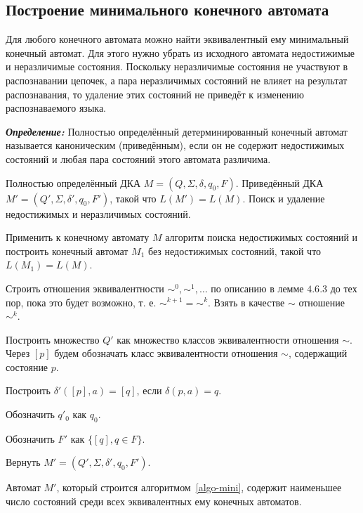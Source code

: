 \subsection*{Построение минимального конечного автомата}
Для любого конечного автомата можно найти эквивалентный ему минимальный конечный автомат. Для этого нужно убрать из исходного автомата недостижимые и неразличимые состояния. Поскольку неразличимые состояния не участвуют в распознавании цепочек, а пара неразличимых состояний не влияет на результат распознавания, то удаление этих состояний не приведёт к изменению распознаваемого языка.

\textbf{\textit{Определение:}} Полностью определённый детерминированный конечный автомат называется каноническим (приведённым), если он не содержит недостижимых состояний и любая пара состояний этого автомата различима.

{
	Полностью определённый ДКА $M = (Q,\Sigma, \delta, q_0, F)$.
}
{
	Приведённый ДКА $M' = (Q',\Sigma, \delta', q_0, F')$, такой что $L(M') = L(M)$.
}
{
	Поиск и удаление недостижимых и неразличимых состояний.
}
{
\item Применить к конечному автомату $M$ алгоритм поиска недостижимых состояний и построить конечный автомат $M_1$ без недостижимых состояний, такой что $L(M_1) = L(M)$.
\item Строить отношения эквивалентности $\sim^0, \sim^1, \ldots $ по описанию в лемме $4.6.3$ до тех пор, пока это будет возможно, т. е. $\sim^{k+1} = \sim^{k}$. Взять в качестве $\sim$ отношение $\sim^k$.
\item Построить множество $Q'$ как множество классов эквивалентности отношения $\sim$. Через $[p]$ будем обозначать класс эквивалентности отношения $\sim$, содержащий состояние $p$.
\item Построить $\delta'([p], a) = [q]$, если $\delta(p,a) = q$.
\item Обозначить $q'_0$ как $q_0$.
\item Обозначить $F'$ как $\{ [q], q \in F \}$.
\item Вернуть  $M' = (Q',\Sigma, \delta', q_0, F')$.
}

\begin{mytheorem}
Автомат $M'$, который строится алгоритмом~\ref{algo-mini}, содержит наименьшее число состояний среди всех эквивалентных ему конечных автоматов.
\end{mytheorem}

